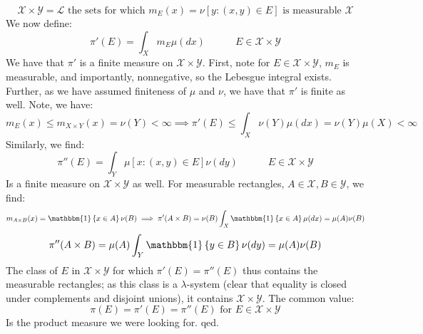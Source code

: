 \documentclass[12pt,a4paper]{article}
\newcommand{\1}[1]{\mathbbm{1}\left\{ #1 \right\}}
\newcommand{\lcal}{\mathcal{L}}
\newcommand{\xcal}{\mathcal{X}}
\newcommand{\ycal}{\mathcal{Y}}
\begin{document}
$$
	\xcal \times \ycal = \lcal \text{ the sets for which $m_E(x) = \nu[y : (x,y) \in E]$ is measurable $\xcal$}
$$
We now define:
$$
	\pi'(E) = \int_X m_E \mu(dx) \quad\quad\quad E \in \xcal \times \ycal
$$
We have that $\pi'$ is a finite measure on $\xcal \times \ycal$. First, note for $E \in \xcal \times \ycal$, $m_E$ is measurable, and importantly, nonnegative, so the Lebesgue integral exists. Further, as we have assumed finiteness of $\mu$ and $\nu$, we have that $\pi'$ is finite as well. Note, we have:
$$
	m_E(x) \leq m_{X \times Y}(x) = \nu(Y) < \infty \implies
	\pi'(E) \leq \int_X \nu(Y) \mu(dx) =
	\nu(Y)\mu(X) < \infty
$$
Similarly, we find:
$$
	\pi''(E) = \int_Y \mu\left[x : (x,y) \in E\right] \nu(dy) \quad\quad\quad E \in \xcal \times \ycal
$$
Is a finite measure on $\xcal \times \ycal$ as well. For measurable rectangles, $A \in \xcal, B \in \ycal$, we find:
$$
	m_{A \times B}(x) = \1{x \in A}\nu(B) \implies
	\pi'(A \times B) = \nu(B) \int_X \1{x \in A} \mu(dx) = \mu(A)\nu(B)
$$
$$
	\pi''(A \times B) = \mu(A) \int_Y \1{y \in B} \nu(dy) = \mu(A)\nu(B)
$$
The class of $E$ in $\xcal \times \ycal$ for which $\pi'(E) = \pi''(E)$ thus contains the measurable rectangles; as this class is a $\lambda$-system (clear that equality is closed under complements and disjoint unions), it contains $\xcal \times \ycal$. The common value:
$$
	\pi(E) = \pi'(E) = \pi''(E) \text{ for $E \in \xcal \times \ycal$}
$$
Is the product measure we were looking for. qed.
\end{document}

